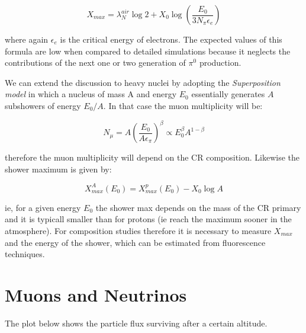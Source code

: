 \documentclass[
  letterpaper,
  DIV=11,
  numbers=noendperiod]{scrreprt}
\begin{document}
\[X_{max} = \lambda^{air}_N \log2 + X_0 \log\left(\frac{E_0}{3N_\pi\epsilon_e}\right) \]

where again \(\epsilon_e\) is the critical energy of electrons. The
expected values of this formula are low when compared to detailed
simulations because it neglects the contributions of the next one or two
generation of \(\pi^0\) production.

\begin{tcolorbox}[enhanced jigsaw, colframe=quarto-callout-note-color-frame, opacitybacktitle=0.6, left=2mm, leftrule=.75mm, opacityback=0, colbacktitle=quarto-callout-note-color!10!white, breakable, bottomrule=.15mm, toprule=.15mm, colback=white, coltitle=black, bottomtitle=1mm, toptitle=1mm, titlerule=0mm, title=\textcolor{quarto-callout-note-color}{\faInfo}\hspace{0.5em}{Superposition model for heavy nuclei air showers}, arc=.35mm, rightrule=.15mm]

We can extend the discussion to heavy nuclei by adopting the
\emph{Superposition model} in which a nucleus of mass A and energy
\(E_0\) essentially generates \(A\) subshowers of energy \(E_0/A\). In
that case the muon multiplicity will be:

\[N_\mu = A \left(\frac{E_0}{A\epsilon_\pi}\right)^\beta \propto E_0^\beta A^{1 - \beta} \]

therefore the muon multiplicity will depend on the CR composition.
Likewise the shower maximum is given by:

\[X^{A}_{max}(E_0) = X_{max}^{p}(E_0) - X_0\log{A}\]

ie, for a given energy \(E_0\) the shower max depends on the mass of the
CR primary and it is typicall smaller than for protons (ie reach the
maximum sooner in the atmosphere). For composition studies therefore it
is necessary to measure \(X_{max}\) and the energy of the shower, which
can be estimated from fluorescence techniques.

\end{tcolorbox}

\section*{Muons and Neutrinos}\label{muons-and-neutrinos}


The plot below shows the particle flux surviving after a certain
altitude.
\end{document}
